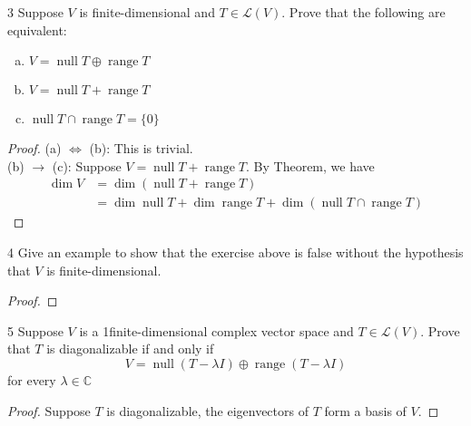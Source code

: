 \documentclass{article}
\newenvironment{problem}[1]{\begin{prob*}{#1}{}}{\end{prob*}}
\DeclareMathOperator{\Null}{null}
\DeclareMathOperator{\Range}{range}
\begin{document}
\begin{problem}{3}
Suppose $V$ is finite-dimensional and $T \in \mathcal{L}(V)$.
Prove that the following are equivalent:
\begin{enumerate}[(a)]
	\item $V = \Null T \oplus \Range T$
	\item $V = \Null T + \Range T$
	\item $\Null T \cap \Range T = \{0\}$
\end{enumerate}
\end{problem}
\begin{proof}
	(a) $\iff$ (b): This is trivial. \\
	(b) $\to$ (c): Suppose $V = \Null T + \Range T$. By Theorem, we have
	\begin{align*}
		\dim V & = \dim (\Null T + \Range T)                                     \\
		       & = \dim \Null T + \dim \Range T + \dim ( \Null T \cap \Range T )
	\end{align*}
\end{proof}

\begin{problem}{4}
Give an example to show that the exercise above is false without
the hypothesis that $V$ is finite-dimensional.
\end{problem}

\begin{proof}
\end{proof}

\begin{problem}{5}
Suppose $V$ is a 1finite-dimensional complex vector space and
$T \in \mathcal{L}(V)$. Prove that $T$ is diagonalizable if and only if \[
	V = \Null (T - \lambda I) \oplus \Range (T - \lambda I)\]
for every $\lambda \in \mathbb{C}$
\end{problem}
\begin{proof}
	Suppose $T$ is diagonalizable, the eigenvectors of
	$T$ form a basis of $V$.
\end{proof}

\end{document}
